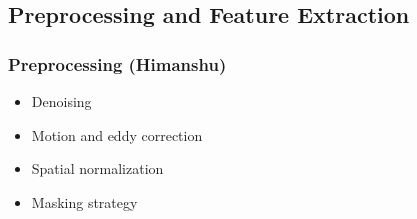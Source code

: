 

\subsection{Preprocessing and Feature Extraction}
\subsubsection{Preprocessing (Himanshu)}
\begin{itemize}
    \item Denoising
    \item Motion and eddy correction
    \item Spatial normalization
    \item Masking strategy
\end{itemize}

